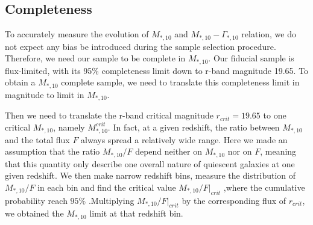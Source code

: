 \documentclass[fleqn,usenatbib]{mnras}
\begin{document}
\subsection{Completeness}
To accurately measure the evolution of $M_{*,10}$ and $M_{*,10} - \Gamma_{*,10} $ relation, we do not expect any bias be introduced during the sample selection procedure. Therefore, we need our sample to be complete in $M_{*,10}$. Our fiducial sample is flux-limited, with its 95\% completeness limit down to r-band magnitude 19.65. To obtain a $M_{*,10}$ complete sample, we need to translate this completeness limit in magnitude to limit in $M_{*,10}$.
\par Then we need to translate the r-band critical magnitude $r_{crit} = 19.65$ to one critical $M_{*,10}$, namely $M_{*,10}^{crit}$. In fact, at a given redshift, the ratio between $M_{*,10}$ and the total flux $F$ always spread a relatively wide range. Here we made an assumption that the ratio $M_{*,10} / F$ depend neither on $M_{*,10} $ nor on $F$, meaning that this quantity only describe one overall nature of quiescent galaxies at one given redshift. We then make narrow redshift bins, measure the distribution of $M_{*,10} / F$ in each bin and find the critical value $M_{*,10} / F|_{crit}$
 ,where the cumulative probability reach $95\%$ .Multiplying $M_{*,10} / F|_{crit}$ by the corresponding flux of $r_{crit}$, we obtained the $M_{*,10}$ limit at that redshift bin. 
\end{document}
